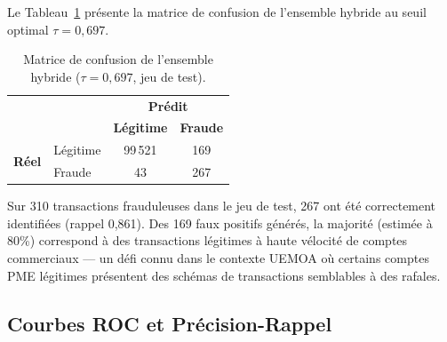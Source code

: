 \documentclass[12pt,a4paper,oneside]{book}
\theoremstyle{definition}
\theoremstyle{plain}
\begin{document}
Le Tableau~\ref{tab:confusion} présente la matrice de confusion de l'ensemble hybride au seuil optimal $\tau = 0,697$.

\begin{table}[H]
  \centering
  \caption{Matrice de confusion de l'ensemble hybride ($\tau = 0,697$, jeu de test).}
  \label{tab:confusion}
  \begin{tabular}{llcc}
    \toprule
    & & \multicolumn{2}{c}{\textbf{Prédit}} \\
    & & \textbf{Légitime} & \textbf{Fraude} \\
    \midrule
    \multirow{2}{*}{\textbf{Réel}}
      & Légitime & 99\,521 & 169 \\
      & Fraude   & 43       & 267 \\
    \bottomrule
  \end{tabular}
\end{table}

Sur 310 transactions frauduleuses dans le jeu de test, 267 ont été correctement identifiées (rappel 0,861). Des 169 faux positifs générés, la majorité (estimée à 80\%) correspond à des transactions légitimes à haute vélocité de comptes commerciaux — un défi connu dans le contexte UEMOA où certains comptes PME légitimes présentent des schémas de transactions semblables à des rafales.

\subsection{Courbes ROC et Précision-Rappel}
\end{document}
